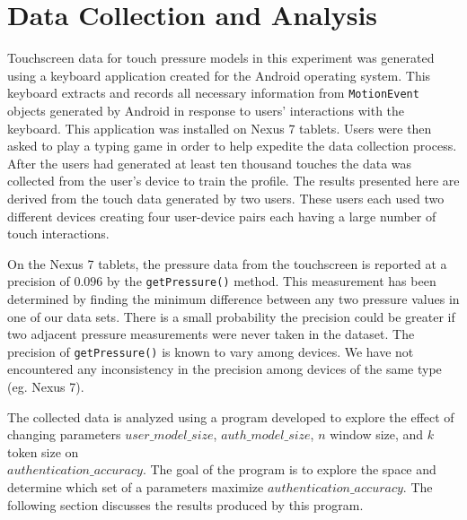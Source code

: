 \documentclass{acm_proc_article-sp}
\begin{document}
\section{Data Collection and Analysis}
\label{sec:data_collection}
Touchscreen data for touch pressure models in this experiment 
was generated using a keyboard application created for the Android operating system. 
This keyboard extracts and records all necessary information 
from {\tt MotionEvent} objects generated by Android in response to
users' interactions with the keyboard.
This application was installed on Nexus 7 tablets.
Users were then asked to play a typing game 
in order to help expedite the data collection process.
After the users had generated at least ten thousand touches the data was collected from the user's device to train the profile.
%
The results presented here are derived from the touch data generated by two users.
These users each used two different devices creating four user-device pairs
each having a large number of touch interactions.

On the Nexus 7 tablets,
the pressure data from the touchscreen is 
reported at a precision of $0.096$ by the {\tt getPressure()} method.
This measurement has been determined
by finding the minimum difference between
any two pressure values in one of our data sets.
%
There is a small probability the precision could
be greater if two adjacent pressure measurements
were never taken in the dataset.
%
The precision of {\tt getPressure()} is
known to vary among devices.
We have not encountered any inconsistency
in the precision among devices of the same type (eg. Nexus 7).

The collected data is analyzed using a program
developed to explore the effect of changing
parameters
$user\_model\_size$, $auth\_model\_size$,
$n$ window size, and $k$ token size
on\\
$authentication\_accuracy$.
%
The goal of the program is to
explore the space and determine which
set of a parameters maximize $authentication\_accuracy$.
%
The following section discusses the results 
produced by this program.

%
%
\end{document}
